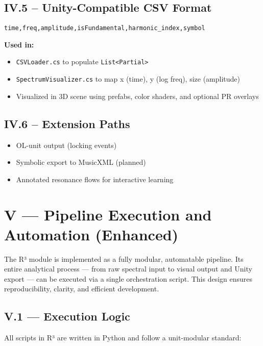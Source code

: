 \subsection*{IV.5 – Unity-Compatible CSV Format}

\begin{verbatim}
time,freq,amplitude,isFundamental,harmonic_index,symbol
\end{verbatim}

\textbf{Used in:}

\begin{itemize}
    \item \texttt{CSVLoader.cs} to populate \texttt{List<Partial>}
    \item \texttt{SpectrumVisualizer.cs} to map x (time), y (log freq), size (amplitude)
    \item Visualized in 3D scene using prefabs, color shaders, and optional PR overlays
\end{itemize}

\subsection*{IV.6 – Extension Paths}

\begin{itemize}
    \item OL-unit output (locking events)
    \item Symbolic export to MusicXML (planned)
    \item Annotated resonance flows for interactive learning
\end{itemize}

\section*{V — Pipeline Execution and Automation (Enhanced)}

The R³ module is implemented as a fully modular, automatable pipeline. Its entire analytical process — from raw spectral input to visual output and Unity export — can be executed via a single orchestration script. This design ensures reproducibility, clarity, and efficient development.

\subsection*{V.1 — Execution Logic}

All scripts in R³ are written in Python and follow a unit-modular standard:

